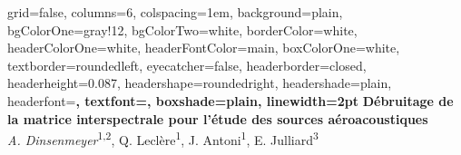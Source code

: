 \documentclass[portrait,final,a0paper,]{baposter}
\begin{document}


\begin{poster}%
  {
  grid=false,
  columns=6,
  colspacing=1em,
  background=plain,%
  bgColorOne=gray!12,%
  bgColorTwo=white,
  borderColor=white,%
  headerColorOne=white,%
  headerFontColor=main,%
  boxColorOne=white,%
  textborder=roundedleft,%
  eyecatcher=false,
  headerborder=closed,
  headerheight=0.087\textheight,
  headershape=roundedright,
  headershade=plain,%
  headerfont=\Large\bfseries,%
  textfont={\setlength{\parindent}{1.5em}},
  boxshade=plain,
  linewidth=2pt
  }
  {  }
 {
\vspace{0.4cm}\textcolor{main}{\textbf{Débruitage de la matrice interspectrale pour l'étude des sources aéroacoustiques}}}
  { ~\\ \textit{A. Dinsenmeyer}\textsuperscript{1,2}, Q. Leclère\textsuperscript{1}, J. Antoni\textsuperscript{1}, E. Julliard\hspace{0.1ex}\textsuperscript{3}}
  {  }
  

\end{poster}
\end{document}
